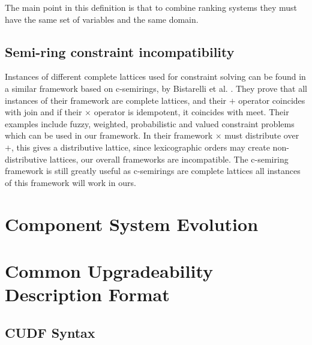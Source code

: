The main point in this definition is that to combine ranking systems they must have the same set of variables 
and the same domain.

\subsection{Semi-ring constraint incompatibility}
Instances of different complete lattices used for constraint solving can be found in a similar framework based on c-semirings, 
by Bistarelli et al. \cite{Bistarelli1997}.
They prove that all instances of their framework are complete lattices, and their $+$ operator coincides with join
and if their $\times$ operator is idempotent, it coincides with meet.
Their examples include fuzzy, weighted, probabilistic and valued constraint problems which can be used in our framework.
In their framework $\times$ must distribute over $+$, this gives a distributive lattice,
since lexicographic orders may create non-distributive lattices, our overall frameworks are incompatible.
The c-semiring framework is still greatly useful as c-semirings are complete lattices all instances of this framework will work in ours.


\section{Component System Evolution}
\label{formal.evo}

\section{Common Upgradeability Description Format}
\label{formal.cudf}

{}\cite{treinen2009common}



\subsection{CUDF Syntax}

